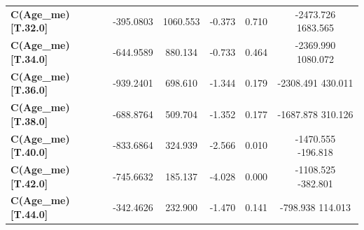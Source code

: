 \begin{subappendices}
\begin{table}[H]
{\begin{tabular}{lccccc}
\textbf{C(Age_me)[T.32.0]}                                           &    -395.0803  &     1060.553     &    -0.373  &         0.710        &     -2473.726  1683.565       \\
\textbf{C(Age_me)[T.34.0]}                                           &    -644.9589  &      880.134     &    -0.733  &         0.464        &     -2369.990  1080.072       \\
\textbf{C(Age_me)[T.36.0]}                                           &    -939.2401  &      698.610     &    -1.344  &         0.179        &     -2308.491   430.011       \\
\textbf{C(Age_me)[T.38.0]}                                           &    -688.8764  &      509.704     &    -1.352  &         0.177        &     -1687.878   310.126       \\
\textbf{C(Age_me)[T.40.0]}                                           &    -833.6864  &      324.939     &    -2.566  &         0.010        &     -1470.555  -196.818       \\
\textbf{C(Age_me)[T.42.0]}                                           &    -745.6632  &      185.137     &    -4.028  &         0.000        &     -1108.525  -382.801       \\
\textbf{C(Age_me)[T.44.0]}                                           &    -342.4626  &      232.900     &    -1.470  &         0.141        &      -798.938   114.013       \\

\end{tabular}}
\end{table}
\end{subappendices}

